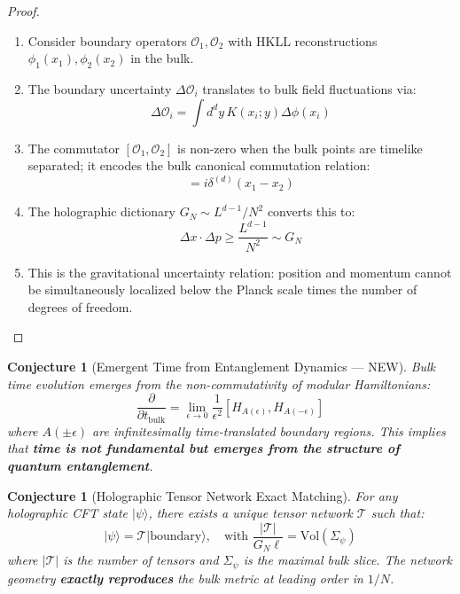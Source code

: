 \documentclass[12pt,a4paper]{article}
\newtheorem{conjecture}[theorem]{Conjecture}
\begin{document}
\begin{proof}
\begin{enumerate}
    \item Consider boundary operators $\mathcal{O}_1, \mathcal{O}_2$ with HKLL reconstructions $\phi_1(x_1), \phi_2(x_2)$ in the bulk.
    
    \item The boundary uncertainty $\Delta \mathcal{O}_i$ translates to bulk field fluctuations via:
    \begin{equation}
    \Delta \mathcal{O}_i = \int d^dy \, K(x_i; y) \Delta \phi(x_i)
    \end{equation}
    
    \item The commutator $[\mathcal{O}_1, \mathcal{O}_2]$ is non-zero when the bulk points are timelike separated; it encodes the bulk canonical commutation relation:
    \begin{equation}
    [\phi(x_1), \pi(x_2)] = i \delta^{(d)}(x_1 - x_2)
    \end{equation}
    
    \item The holographic dictionary $G_N \sim L^{d-1}/N^2$ converts this to:
    \begin{equation}
    \Delta x \cdot \Delta p \geq \frac{L^{d-1}}{N^2} \sim G_N
    \end{equation}
    
    \item This is the gravitational uncertainty relation: position and momentum cannot be simultaneously localized below the Planck scale times the number of degrees of freedom.
\end{enumerate}
\end{proof}

\begin{conjecture}[Emergent Time from Entanglement Dynamics --- NEW]
Bulk time evolution emerges from the non-commutativity of modular Hamiltonians:
\begin{equation}
\frac{\partial}{\partial t_{\text{bulk}}} = \lim_{\epsilon \to 0} \frac{1}{\epsilon^2} [H_{A(\epsilon)}, H_{A(-\epsilon)}]
\end{equation}
where $A(\pm \epsilon)$ are infinitesimally time-translated boundary regions. This implies that \textbf{time is not fundamental but emerges from the structure of quantum entanglement}.
\end{conjecture}

\begin{conjecture}[Holographic Tensor Network Exact Matching]
For any holographic CFT state $|\psi\rangle$, there exists a unique tensor network $\mathcal{T}$ such that:
\begin{equation}
|\psi\rangle = \mathcal{T}|\text{boundary}\rangle, \quad \text{with } \frac{|\mathcal{T}|}{G_N \ell} = \text{Vol}(\Sigma_{\psi})
\end{equation}
where $|\mathcal{T}|$ is the number of tensors and $\Sigma_\psi$ is the maximal bulk slice. The network geometry \textbf{exactly reproduces} the bulk metric at leading order in $1/N$.
\end{conjecture}
\end{document}
